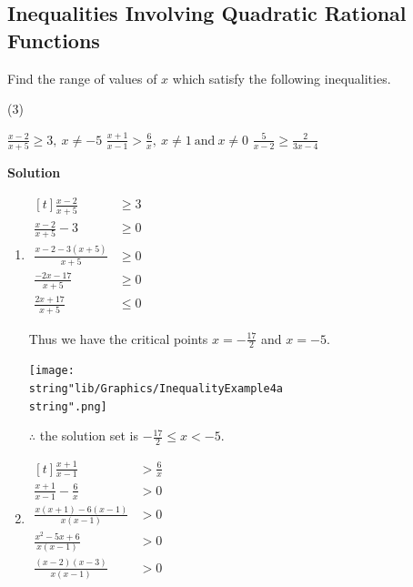 \documentclass[11pt,a4paper]{book}
\begin{document}
\subsection{Inequalities Involving Quadratic Rational Functions}
\begin{example}{}
Find the range of values of $x$ which satisfy the following inequalities.

\begin{tasks}[label=(\alph*),label-width=3.5ex](3)

\task ${\displaystyle \frac{x-2}{x+5}\geq3,\:x\neq-5}$
\task ${\displaystyle \frac{x+1}{x-1}>\frac{6}{x},\:x\neq1\:\text{and}\:x\neq0}$
\task ${\displaystyle \frac{5}{x-2}\geq\frac{2}{3x-4}}$

\end{tasks}

\textbf{\large{}Solution}{\large\par}

\begin{enumerate}[label=(\alph*)]

\item
$
\begin{aligned}[t]
\frac{x-2}{x+5} & \geq3\\
\frac{x-2}{x+5}-3 & \geq0\\
\frac{x-2-3\left(x+5\right)}{x+5} & \geq0\\
\frac{-2x-17}{x+5} & \geq0\\
\frac{2x+17}{x+5} & \leq0
\end{aligned}
$

Thus we have the critical points ${\displaystyle x=-\frac{17}{2}}$
and $x=-5$.
\begin{center}
\texttt{[image: \\string"lib/Graphics/InequalityExample4a\\string".png]}
\par\end{center}

$\therefore$ the solution set is ${\displaystyle -\frac{17}{2}\leq x<-5}$.

\item
$
\begin{aligned}[t]
\frac{x+1}{x-1} & >\frac{6}{x}\\
\frac{x+1}{x-1}-\frac{6}{x} & >0\\
\frac{x\left(x+1\right)-6\left(x-1\right)}{x\left(x-1\right)} & >0\\
\frac{x^{2}-5x+6}{x\left(x-1\right)} & >0\\
\frac{\left(x-2\right)\left(x-3\right)}{x\left(x-1\right)} & >0
\end{aligned}
$


\end{enumerate}
\end{example}
\end{document}
